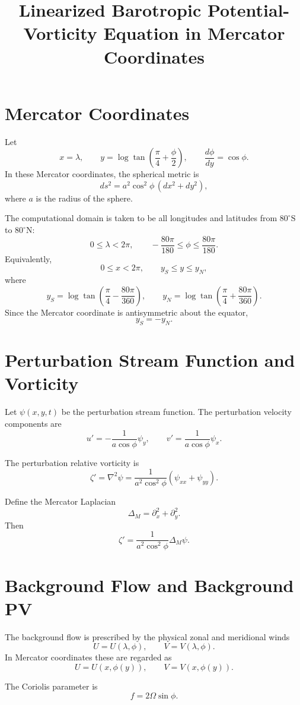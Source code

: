 \documentclass[11pt]{article}
\title{Linearized Barotropic Potential-Vorticity Equation in Mercator Coordinates}
\author{}
\date{}
\begin{document}
\maketitle

\section{Mercator Coordinates}

Let
\[
x=\lambda,\qquad 
y=\log \tan\left(\frac{\pi}{4}+\frac{\phi}{2}\right),
\qquad 
\frac{d\phi}{dy}=\cos\phi .
\]
In these Mercator coordinates, the spherical metric is
\[
ds^2=a^2\cos^2\phi\,(dx^2+dy^2),
\]
where \(a\) is the radius of the sphere.

The computational domain is taken to be all longitudes and latitudes from
\(80^\circ\mathrm{S}\) to \(80^\circ\mathrm{N}\):
\[
0\leq \lambda < 2\pi,
\qquad
-\frac{80\pi}{180}\leq \phi \leq \frac{80\pi}{180}.
\]
Equivalently,
\[
0\leq x<2\pi,
\qquad
y_S\leq y\leq y_N,
\]
where
\[
y_S
=
\log\tan\left(
\frac{\pi}{4}
-\frac{80\pi}{360}
\right),
\qquad
y_N
=
\log\tan\left(
\frac{\pi}{4}
+\frac{80\pi}{360}
\right).
\]
Since the Mercator coordinate is antisymmetric about the equator,
\[
y_S=-y_N .
\]

\section{Perturbation Stream Function and Vorticity}

Let \(\psi(x,y,t)\) be the perturbation stream function. The perturbation velocity components are
\[
u'=-\frac{1}{a\cos\phi}\psi_y,
\qquad
v'=\frac{1}{a\cos\phi}\psi_x .
\]

The perturbation relative vorticity is
\[
\zeta'
=
\nabla^2\psi
=
\frac{1}{a^2\cos^2\phi}
\left(\psi_{xx}+\psi_{yy}\right).
\]

Define the Mercator Laplacian
\[
\Delta_M=\partial_x^2+\partial_y^2 .
\]
Then
\[
\zeta'
=
\frac{1}{a^2\cos^2\phi}\Delta_M\psi .
\]

\section{Background Flow and Background PV}

The background flow is prescribed by the physical zonal and meridional winds
\[
U=U(\lambda,\phi),
\qquad
V=V(\lambda,\phi).
\]
In Mercator coordinates these are regarded as
\[
U=U(x,\phi(y)),
\qquad
V=V(x,\phi(y)).
\]

The Coriolis parameter is
\[
f=2\Omega\sin\phi .
\]
\end{document}
